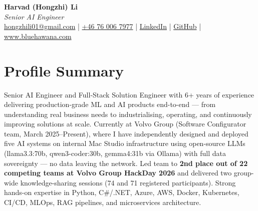 \documentclass[a4paper,10pt]{article}
\begin{document}
\pagestyle{empty}

\begin{center}
{\LARGE \textbf{Harvad (Hongzhi) Li}}\\[10pt]
{\Large \textit{Senior AI Engineer}}\\[10pt]
\textcolor{linkedinblue}{
  \href{mailto:hongzhili01@gmail.com}{hongzhili01@gmail.com} |
  \href{tel:+46760067977}{+46 76 006 7977} |
  \href{https://www.linkedin.com/in/harvad/}{LinkedIn} |
  \href{https://github.com/bluehawana}{GitHub} |
  \href{https://www.bluehawana.com}{www.bluehawana.com}
}
\end{center}

\section*{Profile Summary}
Senior AI Engineer and Full-Stack Solution Engineer with 6+ years of experience delivering production-grade ML and AI products end-to-end --- from understanding real business needs to industrialising, operating, and continuously improving solutions at scale. Currently at Volvo Group (Software Configurator team, March 2025--Present), where I have independently designed and deployed five AI systems on internal Mac Studio infrastructure using open-source LLMs (llama3.3:70b, qwen3-coder:30b, gemma4:31b via Ollama) with full data sovereignty --- no data leaving the network. Led team to \textbf{2nd place out of 22 competing teams at Volvo Group HackDay 2026} and delivered two group-wide knowledge-sharing sessions (74 and 71 registered participants). Strong hands-on expertise in Python, C\#/.NET, Azure, AWS, Docker, Kubernetes, CI/CD, MLOps, RAG pipelines, and microservices architecture.

\end{document}
